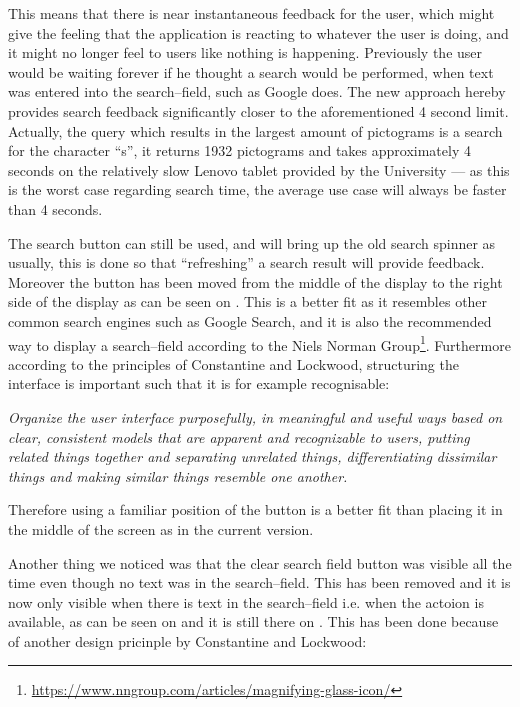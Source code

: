 This means that there is near instantaneous feedback for the user, which might give the feeling that the application is reacting to whatever the user is doing, and it might no longer feel to users like nothing is happening.
Previously the user would be waiting forever if he thought a search would be performed, when text was entered into the search--field, such as Google does.
The new approach hereby provides search feedback significantly closer to the aforementioned 4 second limit.
Actually, the query which results in the largest amount of pictograms is a search for the character \enquote{s}, it returns 1932 pictograms and takes approximately 4 seconds on the relatively slow Lenovo tablet provided by the University --- as this is the worst case regarding search time, the average use case will always be faster than 4 seconds.

The search button can still be used, and will bring up the old search spinner as usually, this is done so that \enquote{refreshing} a search result will provide feedback.
Moreover the button has been moved from the middle of the display to the right side of the display as can be seen on .
This is a better fit as it resembles other common search engines such as Google Search, and it is also the recommended way to display a search--field according to the Niels Norman Group\footnote{\url{https://www.nngroup.com/articles/magnifying-glass-icon/}}.
Furthermore according to the principles of Constantine and Lockwood, structuring the interface is important such that it is for example recognisable:

\begin{displayquote}
\textit{Organize the user interface purposefully, in meaningful and useful ways based on clear, consistent models that are apparent and recognizable to users, putting related things together and separating unrelated things, differentiating dissimilar things and making similar things resemble one
another.}\cite[p.~51]{DESIGNBOOK}
\end{displayquote}
\noindent
Therefore using a familiar position of the button is a better fit than placing it in the middle of the screen as in the current version.

Another thing we noticed was that the clear search field button was visible all the time even though no text was in the search--field.
This has been removed and it is now only visible when there is text in the search--field i.e. when the actoion is available, as can be seen on  and it is still there on .
This has been done because of another design pricinple by Constantine and Lockwood:

